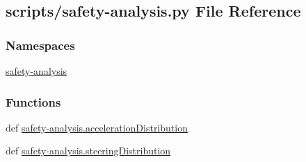\hypertarget{safety-analysis_8py}{\subsection{scripts/safety-\/analysis.py File Reference}
\label{safety-analysis_8py}
}
\subsubsection*{Namespaces}
\begin{DoxyCompactItemize}
\item 
\hyperlink{namespacesafety-analysis}{safety-\/analysis}
\end{DoxyCompactItemize}
\subsubsection*{Functions}
\begin{DoxyCompactItemize}
\item 
def \hyperlink{namespacesafety-analysis_a4835cb64b2253634ecf8a1b9c338c787}{safety-\/analysis.\-acceleration\-Distribution}
\item 
def \hyperlink{namespacesafety-analysis_acde6413c5a80f3a5a92c7e58451545a7}{safety-\/analysis.\-steering\-Distribution}
\end{DoxyCompactItemize}
